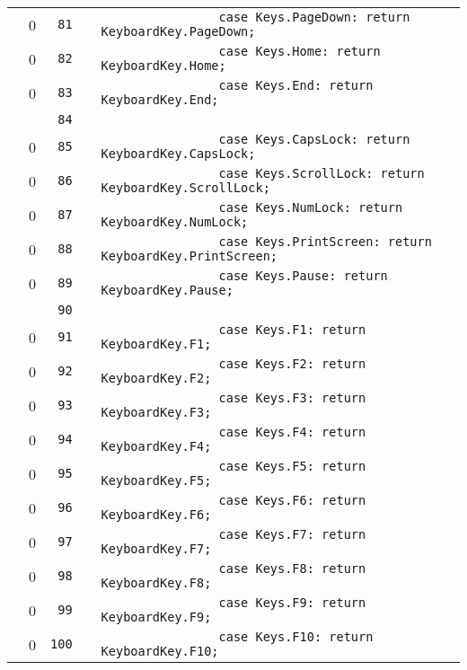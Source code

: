 \documentclass[a4paper,landscape,10pt]{article}
\begin{document}
\begin{longtable}[l]{lrrll}
\cellcolor{red} & 0 & \verb~81~ & & \verb~                case Keys.PageDown: return KeyboardKey.PageDown;~\\
\cellcolor{red} & 0 & \verb~82~ & & \verb~                case Keys.Home: return KeyboardKey.Home;~\\
\cellcolor{red} & 0 & \verb~83~ & & \verb~                case Keys.End: return KeyboardKey.End;~\\
\cellcolor{gray} &  & \verb~84~ & & \verb~~\\
\cellcolor{red} & 0 & \verb~85~ & & \verb~                case Keys.CapsLock: return KeyboardKey.CapsLock;~\\
\cellcolor{red} & 0 & \verb~86~ & & \verb~                case Keys.ScrollLock: return KeyboardKey.ScrollLock;~\\
\cellcolor{red} & 0 & \verb~87~ & & \verb~                case Keys.NumLock: return KeyboardKey.NumLock;~\\
\cellcolor{red} & 0 & \verb~88~ & & \verb~                case Keys.PrintScreen: return KeyboardKey.PrintScreen;~\\
\cellcolor{red} & 0 & \verb~89~ & & \verb~                case Keys.Pause: return KeyboardKey.Pause;~\\
\cellcolor{gray} &  & \verb~90~ & & \verb~~\\
\cellcolor{red} & 0 & \verb~91~ & & \verb~                case Keys.F1: return KeyboardKey.F1;~\\
\cellcolor{red} & 0 & \verb~92~ & & \verb~                case Keys.F2: return KeyboardKey.F2;~\\
\cellcolor{red} & 0 & \verb~93~ & & \verb~                case Keys.F3: return KeyboardKey.F3;~\\
\cellcolor{red} & 0 & \verb~94~ & & \verb~                case Keys.F4: return KeyboardKey.F4;~\\
\cellcolor{red} & 0 & \verb~95~ & & \verb~                case Keys.F5: return KeyboardKey.F5;~\\
\cellcolor{red} & 0 & \verb~96~ & & \verb~                case Keys.F6: return KeyboardKey.F6;~\\
\cellcolor{red} & 0 & \verb~97~ & & \verb~                case Keys.F7: return KeyboardKey.F7;~\\
\cellcolor{red} & 0 & \verb~98~ & & \verb~                case Keys.F8: return KeyboardKey.F8;~\\
\cellcolor{red} & 0 & \verb~99~ & & \verb~                case Keys.F9: return KeyboardKey.F9;~\\
\cellcolor{red} & 0 & \verb~100~ & & \verb~                case Keys.F10: return KeyboardKey.F10;~\\

\end{longtable}
\end{document}
